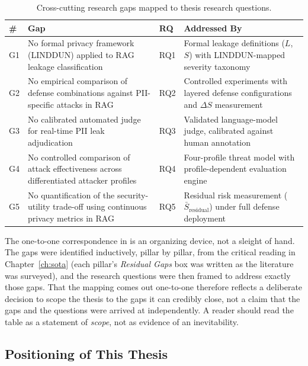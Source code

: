 \documentclass[12pt,a4paper]{report}
\begin{document}
\begin{table}[H]
\centering
\caption{Cross-cutting research gaps mapped to thesis research questions.}
\label{tab:gap-matrix}
\footnotesize

\begin{tabular}{C{0.5cm}W{6.5cm}C{1.2cm}W{4.5cm}}
\toprule

\textbf{\#} &
\textbf{Gap} &
\textbf{RQ} &
\textbf{Addressed By} \\
\midrule
G1 & No formal privacy framework (LINDDUN) applied to RAG leakage classification & RQ1 & Formal leakage definitions ($L$, $S$) with LINDDUN-mapped severity taxonomy \\
G2 & No empirical comparison of defense combinations against PII-specific attacks in RAG & RQ2 & Controlled experiments with layered defense configurations and $\Delta S$ measurement \\
G3 & No calibrated automated judge for real-time PII leak adjudication & RQ3 & Validated language-model judge, calibrated against human annotation \\
G4 & No controlled comparison of attack effectiveness across differentiated attacker profiles & RQ4 & Four-profile threat model with profile-dependent evaluation engine \\
G5 & No quantification of the security-utility trade-off using continuous privacy metrics in RAG & RQ5 & Residual risk measurement ($\bar{S}_{\text{residual}}$) under full defense deployment \\
\bottomrule
\end{tabular}
\end{table}

The one-to-one correspondence in  is an organizing device, not a sleight of
hand. The gaps were identified inductively, pillar by pillar, from the critical reading in
Chapter~\ref{ch:sota} (each pillar's \emph{Residual Gaps} box was written as the literature was
surveyed), and the research questions were then framed to address exactly those gaps. That the
mapping comes out one-to-one therefore reflects a deliberate decision to scope the thesis to the gaps
it can credibly close, not a claim that the gaps and the questions were arrived at independently. A
reader should read the table as a statement of \emph{scope}, not as evidence of an inevitability.

\subsection{Positioning of This Thesis}
\end{document}
